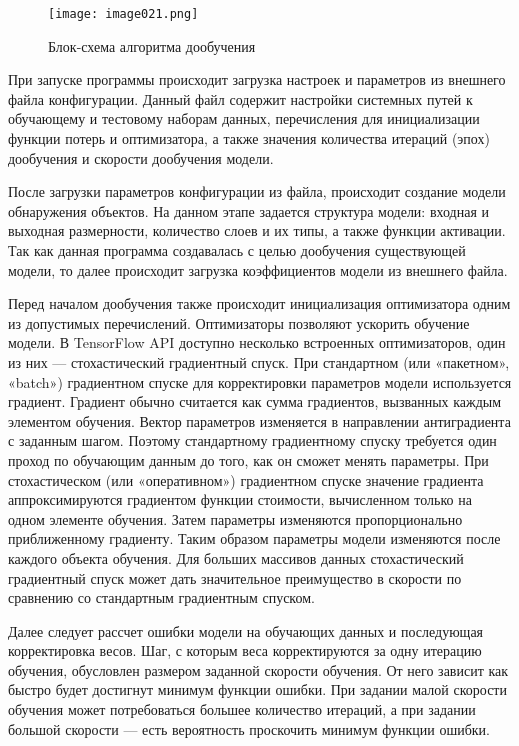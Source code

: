 \begin{figure}[htbp]
\centering
\texttt{[image: image021.png]}
\caption{Блок-схема алгоритма дообучения}%
\label{fig:transferlearningscheme}
\end{figure}

При запуске программы происходит загрузка настроек и параметров из внешнего файла конфигурации. Данный файл содержит настройки системных путей к обучающему и тестовому наборам данных, перечисления для инициализации функции потерь и оптимизатора, а также значения количества итераций (эпох) дообучения и скорости дообучения модели.

После загрузки параметров конфигурации из файла, происходит создание модели обнаружения объектов. На данном этапе задается структура модели: входная и выходная размерности, количество слоев и их типы, а также функции активации. Так как данная программа создавалась с целью дообучения существующей модели, то далее происходит загрузка коэффициентов модели из внешнего файла.

Перед началом дообучения также происходит инициализация оптимизатора одним из допустимых перечислений. Оптимизаторы позволяют ускорить обучение модели. В TensorFlow API доступно несколько встроенных оптимизаторов, один из них — стохастический градиентный спуск. При стандартном (или «пакетном», «batch») градиентном спуске для корректировки параметров модели используется градиент. Градиент обычно считается как сумма градиентов, вызванных каждым элементом обучения. Вектор параметров изменяется в направлении антиградиента с заданным шагом. Поэтому стандартному градиентному спуску требуется один проход по обучающим данным до того, как он сможет менять параметры. При стохастическом (или «оперативном») градиентном спуске значение градиента аппроксимируются градиентом функции стоимости, вычисленном только на одном элементе обучения. Затем параметры изменяются пропорционально приближенному градиенту. Таким образом параметры модели изменяются после каждого объекта обучения. Для больших массивов данных стохастический градиентный спуск может дать значительное преимущество в скорости по сравнению со стандартным градиентным спуском\cite{eighteen}. 

Далее следует рассчет ошибки модели на обучающих данных и последующая корректировка весов. Шаг, с которым веса корректируются за одну итерацию обучения, обусловлен размером заданной скорости обучения. От него зависит как быстро будет достигнут минимум функции ошибки. При задании малой скорости обучения может потребоваться большее количество итераций, а при задании большой скорости — есть вероятность проскочить минимум функции ошибки.

